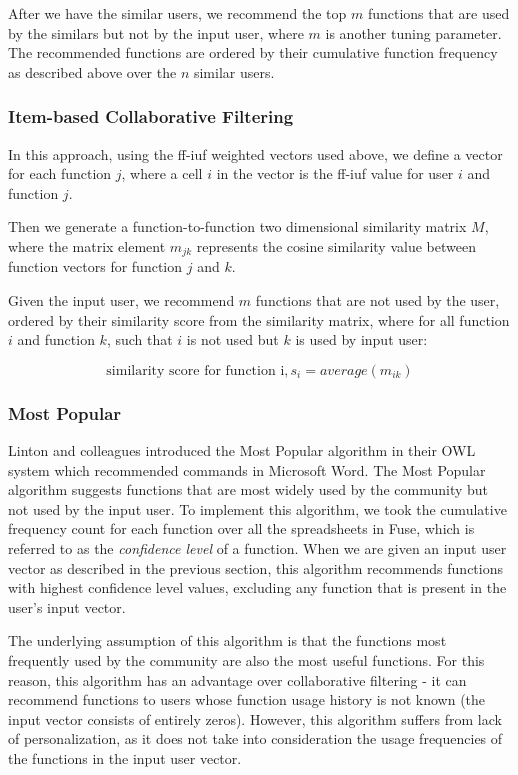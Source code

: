 \documentclass{article} %
\begin{document}
After we have the similar users, we recommend the top $m$ functions that are used by the similars but not by the input user, where $m$ is another tuning parameter. The recommended functions are ordered by their cumulative function frequency as described above over the $n$ similar users.

\subsubsection{Item-based Collaborative Filtering}
In this approach, using the ff-iuf weighted vectors used above, we define a vector for each function $j$, where a cell $i$ in the vector is the ff-iuf value for user $i$ and function $j$.

Then we generate a function-to-function two dimensional similarity matrix $M$, where the matrix element $m_{jk}$ represents the cosine similarity value between function vectors for function $j$ and $k$.

Given the input user, we recommend $m$ functions that are not used by the user, ordered by their similarity score from the similarity matrix, where for all function $i$ and function $k$, such that $i$ is not used but $k$ is used by input user:
\begin{center}
   \begin{displaymath}
   \mbox{similarity score for function i}, s_i = average(m_{ik})
   \end{displaymath}
\end{center}


\subsubsection{Most Popular}
Linton and colleagues introduced the Most Popular algorithm in their OWL~\cite{linton2000owl} system which recommended commands in Microsoft Word. The Most Popular algorithm suggests functions that are most widely used by the community but not used by the input user. To implement this algorithm, we took the cumulative frequency count for each function over all the spreadsheets in Fuse, which is referred to as the \textit{confidence level} of a function. When we are given an input user vector as described in the previous section, this algorithm recommends functions with highest confidence level values, excluding any function that is present in the user's input vector.

The underlying assumption of this algorithm is that the functions most frequently used by the community are also the most useful functions. For this reason, this algorithm has an advantage over collaborative filtering - it can recommend functions to users whose function usage history is not known (the input vector consists of entirely zeros). However, this algorithm suffers from lack of personalization, as it does not take into consideration the usage frequencies of the functions in the input user vector.
\end{document}
